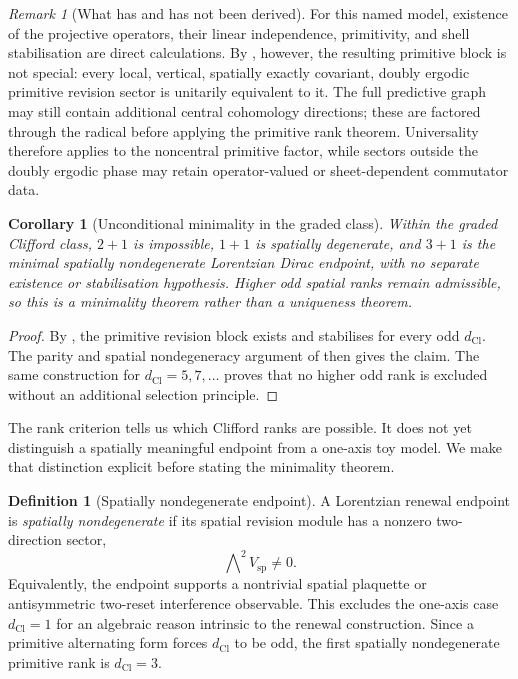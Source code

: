 \documentclass[11pt]{article}
\newtheorem{corollary}[theorem]{Corollary}
\theoremstyle{definition}
\newtheorem{definition}[theorem]{Definition}
\theoremstyle{remark}
\newtheorem{remark}[theorem]{Remark}
\newcommand{\dCl}{d_{\mathrm{Cl}}}
\begin{document}
\begin{remark}[What has and has not been derived]
\label{rem:graded-clifford-scope}
For this named model, existence of the projective operators, their linear
independence, primitivity, and shell stabilisation are direct calculations.  By
, however, the resulting primitive block is
not special: every local, vertical, spatially exactly covariant, doubly
ergodic primitive revision sector is unitarily equivalent to it.  The full
predictive graph may still contain additional central cohomology directions;
these are factored through the radical before applying the primitive rank
theorem.  Universality therefore applies to the noncentral primitive factor,
while sectors outside the doubly ergodic phase may retain operator-valued or
sheet-dependent commutator data.
\end{remark}

\begin{corollary}[Unconditional minimality in the graded class]
\label{cor:graded-unconditional-minimality}
Within the graded Clifford class, \(2+1\) is impossible, \(1+1\) is spatially
degenerate, and \(3+1\) is the minimal spatially nondegenerate Lorentzian Dirac
endpoint, with no separate existence or stabilisation hypothesis.  Higher odd
spatial ranks remain admissible, so this is a minimality theorem rather than a
uniqueness theorem.
\end{corollary}

\begin{proof}
By , the primitive revision block
exists and stabilises for every odd \(\dCl\).  The parity and spatial
nondegeneracy argument of  then gives the
claim.  The same construction for \(\dCl=5,7,\ldots\) proves that no higher odd
rank is excluded without an additional selection principle.
\end{proof}

The rank criterion tells us which Clifford ranks are possible.  It does not yet
distinguish a spatially meaningful endpoint from a one-axis toy model.  We make
that distinction explicit before stating the minimality theorem.

\begin{definition}[Spatially nondegenerate endpoint]
\label{def:spatially-nondegenerate}
A Lorentzian renewal endpoint is \emph{spatially nondegenerate} if its spatial
revision module has a nonzero two-direction sector,
\[
  \bigwedge\nolimits^2 V_{\mathrm{sp}}\neq0.
\]
Equivalently, the endpoint supports a nontrivial spatial plaquette or
antisymmetric two-reset interference observable.  This excludes the one-axis
case \(\dCl=1\) for an algebraic reason intrinsic to the renewal construction.
Since a primitive alternating form forces \(\dCl\) to be odd, the first
spatially nondegenerate primitive rank is \(\dCl=3\).
\end{definition}
\end{document}
